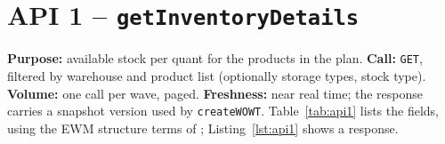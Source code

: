 \documentclass[11pt,a4paper]{article}
\newcommand{\api}[1]{\texttt{#1}}
\begin{document}
\section{API 1 -- \texorpdfstring{\api{getInventoryDetails}}{getInventoryDetails}}
\label{sec:api1}
\textbf{Purpose:} available stock per quant for the products in the plan. \textbf{Call:} \texttt{GET}, filtered by warehouse and
product list (optionally storage types, stock type). \textbf{Volume:} one call per wave, paged. \textbf{Freshness:} near real time;
the response carries a snapshot version used by \api{createWOWT}. Table~\ref{tab:api1} lists the fields, using the EWM structure terms of \cite{sapstruct}; Listing~\ref{lst:api1} shows a response.
\end{document}
